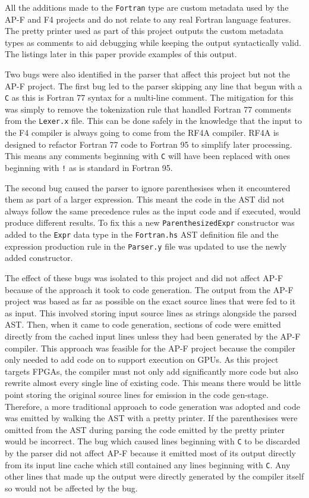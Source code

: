\documentclass{mpaper}
\begin{document}
All the additions made to the \texttt{Fortran} type are custom metadata used by the AP-F and F4 projects and do not relate to any real Fortran language features.
The pretty printer used as part of this project outputs the custom metadata types as comments to aid debugging while keeping the output syntactically valid.
The listings later in this paper provide examples of this output.

Two bugs were also identified in the parser that affect this project but not the AP-F project. 
The first bug led to the parser skipping any line that begun with a \texttt{C} as this is Fortran 77 syntax for a multi-line comment.
The mitigation for this was simply to remove the tokenization rule that handled Fortran 77 comments from the \texttt{Lexer.x} file.
This can be done safely in the knowledge that the input to the F4 compiler is always going to come from the RF4A compiler.
RF4A is designed to refactor Fortran 77 code to Fortran 95 to simplify later processing.
This means any comments beginning with \texttt{C} will have been replaced with ones beginning with \texttt{!} as is standard in Fortran 95.

The second bug caused the parser to ignore parenthesises when it encountered them as part of a larger expression.
This meant the code in the AST did not always follow the same precedence rules as the input code and if executed, would produce different results.
To fix this a new \texttt{ParenthesizedExpr} constructor was added to the \texttt{Expr} data type in the \texttt{Fortran.hs} AST definition file and the expression production rule in the \texttt{Parser.y} file was updated to use the newly added constructor. 

The effect of these bugs was isolated to this project and did not affect AP-F because of the approach it took to code generation.
The output from the AP-F project was based as far as possible on the exact source lines that were fed to it as input.
This involved storing input source lines as strings alongside the parsed AST. 
Then, when it came to code generation, sections of code were emitted directly from the cached input lines unless they had been generated by the AP-F compiler.
This approach was feasible for the AP-F project because the compiler only needed to add code on to support execution on GPUs. 
As this project targets FPGAs, the compiler must not only add significantly more code but also rewrite almost every single line of existing code.
This means there would be little point storing the original source lines for emission in the code gen-stage.
Therefore, a more traditional approach to code generation was adopted and code was emitted by walking the AST with a pretty printer.
If the parenthesises were omitted from the AST during parsing the code emitted by the pretty printer would be incorrect.
The bug which caused lines beginning with \texttt{C} to be discarded by the parser did not affect AP-F because it emitted most of its output directly from its input line cache which still contained any lines beginning with \texttt{C}.
Any other lines that made up the output were directly generated by the compiler itself so would not be affected by the bug.
\end{document}

